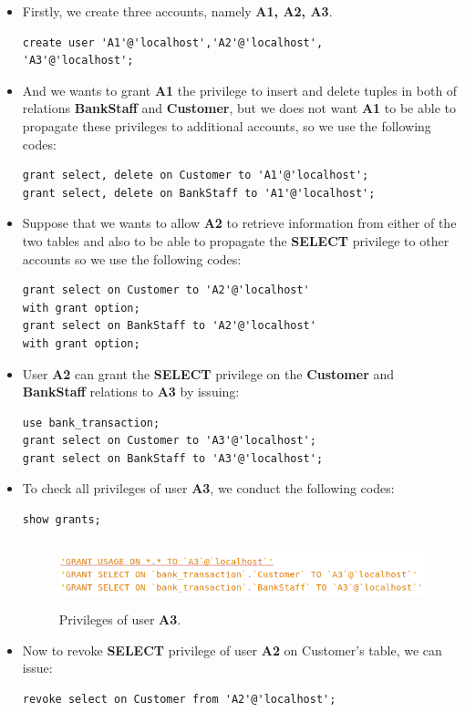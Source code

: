 \documentclass[12pt,a4paper]{article}
\begin{document}
 \begin{itemize}
    \item Firstly, we create three accounts, namely \textbf{A1, A2, A3}.
    \begin{verbatim}
create user 'A1'@'localhost','A2'@'localhost',
'A3'@'localhost';
    \end{verbatim}
    \item And we wants to grant \textbf{A1} the privilege
to insert and delete tuples in both of relations \textbf{BankStaff} and \textbf{Customer}, but we does not want \textbf{A1} to be able to propagate these privileges to additional accounts, so we use the following codes:
    \begin{verbatim}
grant select, delete on Customer to 'A1'@'localhost';
grant select, delete on BankStaff to 'A1'@'localhost';
    \end{verbatim}
    \item Suppose that we wants to allow \textbf{A2} to retrieve information from either of the two tables and also to be able to propagate the \textbf{SELECT} privilege to other accounts so we use the following codes:
    \begin{verbatim}
grant select on Customer to 'A2'@'localhost' 
with grant option;
grant select on BankStaff to 'A2'@'localhost' 
with grant option;
    \end{verbatim}
    \item User \textbf{A2} can grant the \textbf{SELECT} privilege on the \textbf{Customer} and \textbf{BankStaff} relations to \textbf{A3} by issuing:
    \begin{verbatim}
use bank_transaction;
grant select on Customer to 'A3'@'localhost';
grant select on BankStaff to 'A3'@'localhost'; 
    \end{verbatim}
    \item To check all privileges of user \textbf{A3}, we conduct the following codes:
    
    \begin{verbatim}
show grants;    
    \end{verbatim}
    
    \begin{figure}[H]
            \centering
            \includegraphics[width=5in,height=0.75in]{Picture/security2.png}
            \caption{Privileges of user \textbf{A3}.}
    \end{figure}
    
    \item Now to revoke \textbf{SELECT} privilege of user \textbf{A2} on Customer's table, we can issue:
    \begin{verbatim}
revoke select on Customer from 'A2'@'localhost';
    \end{verbatim}
 \end{itemize}
\end{document}
